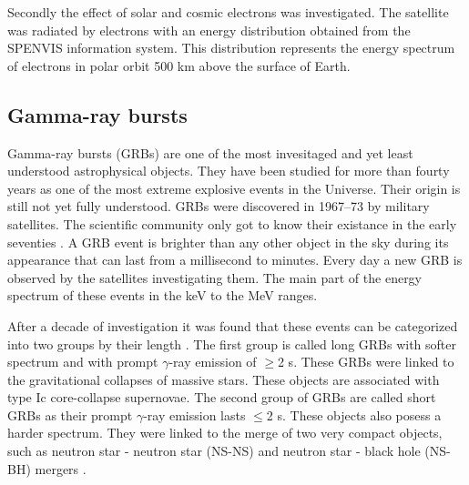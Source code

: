 \documentclass[12pt, a4paper,titlepage]{article}
\numberwithin{equation}{section}
\numberwithin{figure}{section}
\begin{document}
Secondly the effect of solar and cosmic electrons was investigated. The satellite was radiated by electrons with an energy distribution obtained from the SPENVIS information system. This distribution represents the energy spectrum of electrons in polar orbit 500 km above the surface of Earth.

 
\pagebreak

\subsection{Gamma-ray bursts}

Gamma-ray bursts (GRBs) \cite{grb1,grb2,grb3,grb4} are one of the most invesitaged and yet least understood astrophysical objects. They have been studied for more than fourty years as one of the most extreme explosive events in the Universe. Their origin is still not yet fully understood. GRBs were discovered in 1967–73 by military satellites. The scientific community only got to know their existance in the early seventies \cite{grb5}. A GRB event is brighter than any other object in the sky during its appearance that can last from a millisecond to minutes. Every day a new GRB is observed by the satellites investigating them. The main part of the energy spectrum of these events in the keV to the MeV ranges.

After a decade of investigation it was found that these events can be categorized into two groups by their length \cite{grb6,grb7,grb8}. The first group is called long GRBs with softer spectrum and with prompt $\gamma$-ray emission of $\geqslant$2 s. These GRBs were linked to the gravitational collapses of massive stars. These objects are associated with type Ic core-collapse supernovae. The second group of GRBs are called short GRBs as their prompt $\gamma$-ray emission lasts $\leqslant$2 s. These objects also posess a harder spectrum. They were linked to the merge of two very compact objects, such as neutron star - neutron star (NS-NS) and neutron star - black hole (NS-BH) mergers \cite{grb9}.
\end{document}
